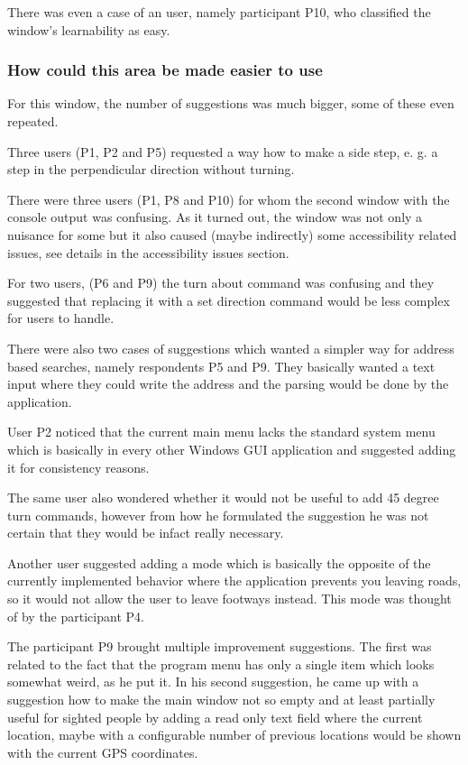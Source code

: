 \documentclass[nolof,digital]{fithesis3}
\begin{document}
There was even a case of an user, namely participant P10, who classified the window's learnability as easy.
\subsubsection{How could this area be made easier to use}
For this window, the number of suggestions was much bigger, some of these even repeated.

Three users (P1, P2 and P5) requested a way how to make a side step, e. g. a step in the perpendicular direction without turning.

There were three users (P1, P8 and P10) for whom the second window with the console output was confusing. As it turned out, the window was not only a nuisance for some but it also caused (maybe indirectly) some accessibility related issues, see details in the accessibility issues section.

For two users, (P6 and P9) the turn about command was confusing and they suggested that replacing it with a set direction command would be less complex for users to handle.

There were also two cases of suggestions which wanted a simpler way for address based searches, namely respondents P5 and P9. They basically wanted a text input where they could write the address and the parsing would be done by the application.

User P2 noticed that the current main menu lacks the standard system menu which is basically in every other Windows GUI application and suggested adding it for consistency reasons.

The same user also wondered whether it would not be useful to add 45 degree turn commands, however from how he formulated the suggestion he was not certain that they would be infact really necessary.

Another user suggested adding a mode which is basically the opposite of the currently implemented behavior where the application prevents you leaving roads, so it would not allow the user to leave footways instead. This mode was thought of by the participant P4.

The participant P9 brought multiple improvement suggestions. The first was related to the fact that the program menu has only a single item which looks somewhat weird, as he put it. In his second suggestion, he came up with a suggestion how to make the main window not so empty and at least partially useful for sighted people by adding a read only text field where the current location, maybe with a configurable number of previous locations would be shown with the current GPS coordinates.
\end{document}
